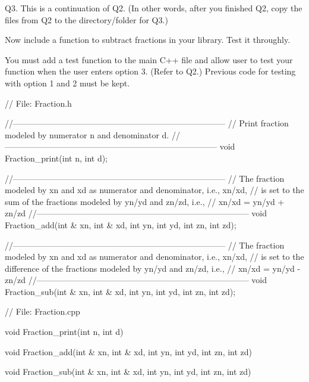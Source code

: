 Q3. This is a continuation of Q2.
(In other words, after you finished Q2, copy the files from Q2
to the directory/folder for Q3.)

Now include a function to subtract fractions in your library.
Test it throughly.

You must add a test function to the main C++ file and allow user to test
your function when the user enters option 3. (Refer to Q2.)
Previous code for testing with option 1 and 2 must be kept.

{\small
\begin{console}
// File: Fraction.h

//-----------------------------------------------------------------------------
// Print fraction modeled by numerator n and denominator d.
//-----------------------------------------------------------------------------
void Fraction_print(int n, int d);

//-----------------------------------------------------------------------------
// The fraction modeled by xn and xd as numerator and denominator, i.e., xn/xd,
// is set to the sum of the fractions modeled by yn/yd and zn/zd, i.e.,
// xn/xd = yn/yd + zn/zd 
//-----------------------------------------------------------------------------
void Fraction_add(int & xn, int & xd,
                  int yn, int yd,
                  int zn, int zd);

//-----------------------------------------------------------------------------
// The fraction modeled by xn and xd as numerator and denominator, i.e., xn/xd,
// is set to the difference of the fractions modeled by yn/yd and zn/zd, i.e.,
// xn/xd = yn/yd - zn/zd 
//-----------------------------------------------------------------------------
void Fraction_sub(int & xn, int & xd,
                  int yn, int yd,
                  int zn, int zd);

\end{console}
\begin{console}
// File: Fraction.cpp

void Fraction_print(int n, int d)
{
}


void Fraction_add(int & xn, int & xd,
                  int yn, int yd,
                  int zn, int zd)
{
}


void Fraction_sub(int & xn, int & xd,
                  int yn, int yd,
                  int zn, int zd)
{
}
\end{console}
}



